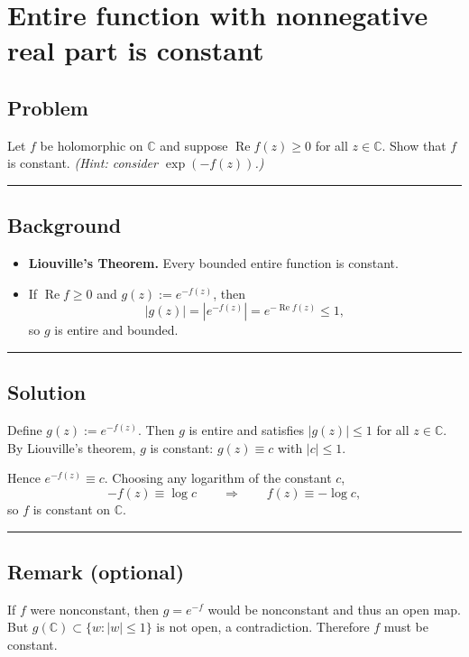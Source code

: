 \documentclass[11pt]{article}
\begin{document}
\section*{Entire function with nonnegative real part is constant}

\subsection*{Problem}
Let $f$ be holomorphic on $\mathbb{C}$ and suppose $\operatorname{Re} f(z)\ge 0$ for all $z\in\mathbb{C}$.
Show that $f$ is constant. \hfill\emph{(Hint: consider $\exp(-f(z))$.)}

\bigskip\hrule\bigskip

\subsection*{Background}
\begin{itemize}
	\item \textbf{Liouville's Theorem.} Every bounded entire function is constant.
	\item If $\operatorname{Re} f\ge 0$ and $g(z):=e^{-f(z)}$, then
	\[
	|g(z)|=|e^{-f(z)}|=e^{-\operatorname{Re} f(z)}\le 1,
	\]
	so $g$ is entire and bounded.
\end{itemize}

\bigskip\hrule\bigskip

\subsection*{Solution}
Define $g(z):=e^{-f(z)}$. Then $g$ is entire and satisfies $|g(z)|\le 1$ for all $z\in\mathbb{C}$.
By Liouville's theorem, $g$ is constant: $g(z)\equiv c$ with $|c|\le 1$.

\medskip

Hence $e^{-f(z)}\equiv c$. Choosing any logarithm of the constant $c$,
\[
-f(z)\equiv \log c \qquad\Longrightarrow\qquad f(z)\equiv -\log c,
\]
so $f$ is constant on $\mathbb{C}$.

\bigskip\hrule\bigskip

\subsection*{Remark (optional)}
If $f$ were nonconstant, then $g=e^{-f}$ would be nonconstant and thus an open map.
But $g(\mathbb{C})\subset\{w:|w|\le 1\}$ is not open, a contradiction.
Therefore $f$ must be constant.
\end{document}
